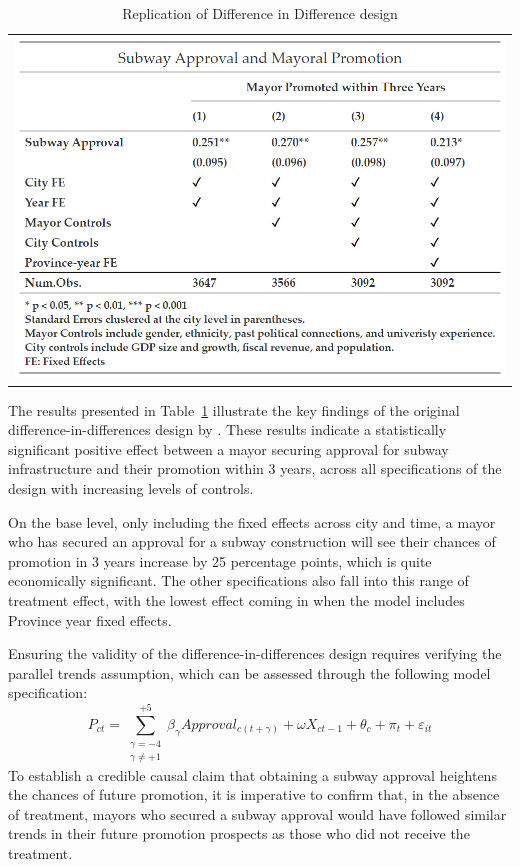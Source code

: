 \documentclass[12pt, ]{article}
\begin{document}
\hypertarget{tbl-replication}{}
\begin{longtable}[]{@{}l@{}}
\caption{\label{tbl-replication}Replication of \citet{lei2022private}
Difference in Difference design}\tabularnewline
\toprule\noalign{}
\endfirsthead
\endhead
\bottomrule\noalign{}
\endlastfoot
\includegraphics{tables/did_replication.png} \\
\end{longtable}

The results presented in Table~\ref{tbl-replication} illustrate the key
findings of the original difference-in-differences design by
\citet{lei2022private}. These results indicate a statistically
significant positive effect between a mayor securing approval for subway
infrastructure and their promotion within 3 years, across all
specifications of the design with increasing levels of controls.

On the base level, only including the fixed effects across city and
time, a mayor who has secured an approval for a subway construction will
see their chances of promotion in 3 years increase by 25 percentage
points, which is quite economically significant. The other
specifications also fall into this range of treatment effect, with the
lowest effect coming in when the model includes Province year fixed
effects.

Ensuring the validity of the difference-in-differences design requires
verifying the parallel trends assumption, which can be assessed through
the following model specification:
\[P_{ct} = \sum_{\substack{\gamma=-4 \\ \gamma \neq +1}}^{+5} \beta_{\gamma} Approval_{c(t+\gamma)} + \omega X_{ct-1} + \theta_c + \pi_t + \varepsilon_{it}\]
To establish a credible causal claim that obtaining a subway approval
heightens the chances of future promotion, it is imperative to confirm
that, in the absence of treatment, mayors who secured a subway approval
would have followed similar trends in their future promotion prospects
as those who did not receive the treatment.
\end{document}
